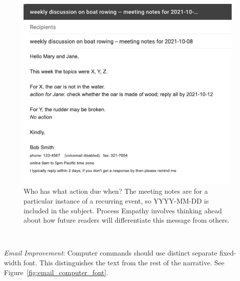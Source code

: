 \begin{figure}%
\includegraphics[width=1\textwidth]{images/email_meeting_notes.pdf}
\caption{Who has what action due when? The meeting notes are for a particular instance of a recurring event, so YYYY-MM-DD is included in the subject. Process Empathy involves thinking ahead about how future readers will differentiate this message from others.}
\label{fig:email_meeting_notes}
\end{figure}

\ \\
\begin{samepage}
\textit{Email Improvement}: Computer commands should use distinct separate fixed-width font. This distinguishes the text from the rest of the narrative.  See Figure~\ref{fig:email_computer_font}.
\end{samepage}


